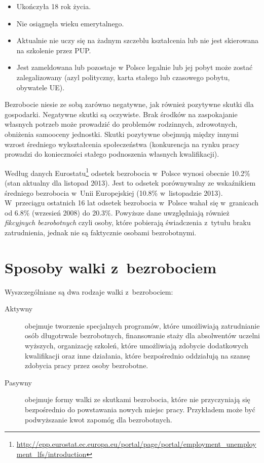 \documentclass[12pt]{article}
\begin{document}
    \begin{itemize}
        \item Ukończyła 18 rok życia.
        \item Nie osiągnęła wieku emerytalnego.
        \item Aktualnie nie uczy się na żadnym szczeblu kształcenia lub nie jest skierowana na szkolenie przez PUP.
        \item Jest zameldowana lub pozostaje w Polsce legalnie lub jej pobyt może zostać zalegalizowany (azyl polityczny, karta stałego lub czasowego pobytu, obywatele UE).
    \end{itemize}
    
    Bezrobocie niesie ze sobą zarówno negatywne, jak również pozytywne skutki dla gospodarki. Negatywne skutki są oczywiste. Brak środków na zaspokajanie własnych potrzeb może prowadzić do problemów rodzinnych, zdrowotnych, obniżenia samooceny jednostki. Skutki pozytywne obejmują między innymi wzrost średniego wykształcenia społeczeństwa (konkurencja na rynku pracy prowadzi do konieczności stałego podnoszenia własnych kwalifikacji).
    
    Według danych Eurostatu\footnote{\url{http://epp.eurostat.ec.europa.eu/portal/page/portal/employment_unemployment_lfs/introduction}} odsetek bezrobocia w~Polsce wynosi obecnie 10.2\% (stan aktualny dla listopad 2013). Jest to odsetek porównywalny ze wskaźnikiem średniego bezrobocia w~Unii Europejskiej (10.8\% w~listopadzie 2013). W~przeciągu ostatnich 16 lat odsetek bezrobocia w~Polsce wahał się w~granicach od 6.8\% (wrzesień 2008) do 20.3\%. Powyższe dane uwzględniają również \emph{fikcyjnych bezrobotnych} czyli osoby, które pobierają świadczenia z~tytułu braku zatrudnienia, jednak nie są faktycznie osobami bezrobotnymi.
    
    \section*{Sposoby walki z~bezrobociem}
    
    Wyszczególniane są dwa rodzaje walki z~bezrobociem:
    
    \begin{description}
        \item[Aktywny] obejmuje tworzenie specjalnych programów, które umożliwiają zatrudnianie osób długotrwale bezrobotnych, finansowanie staży dla absolwentów uczelni wyższych, organizację szkoleń, które umożliwiają zdobycie dodatkowych kwalifikacji oraz inne działania, które bezpośrednio oddziałują na szansę zdobycia pracy przez osoby bezrobotne.
        \item[Pasywny] obejmuje formy walki ze skutkami bezrobocia, które nie przyczyniają się bezpośrednio do powstawania nowych miejsc pracy. Przykładem może być podwyższanie kwot zapomóg dla bezrobotnych.
    \end{description}
   
\end{document}
